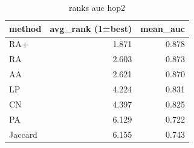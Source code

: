 \begin{table}[t]
\centering
\caption{ranks auc hop2}
\label{tab:ranks_auc_hop2}
\begin{tabular}{lrr}
\hline
method & avg\_rank (1=best) & mean\_auc \\
\hline
RA+ & 1.871 & 0.878 \\
RA & 2.603 & 0.873 \\
AA & 2.621 & 0.870 \\
LP & 4.224 & 0.831 \\
CN & 4.397 & 0.825 \\
PA & 6.129 & 0.722 \\
Jaccard & 6.155 & 0.743 \\
\hline
\end{tabular}
\end{table}